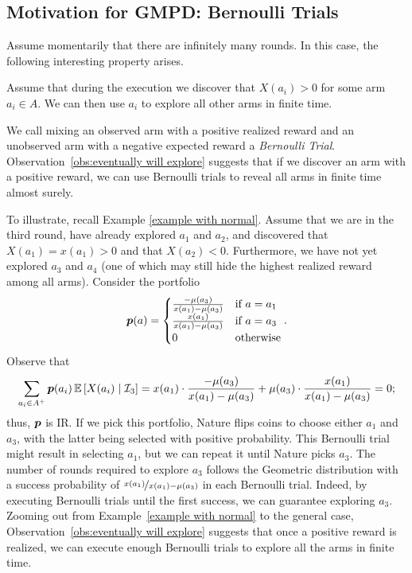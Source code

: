 \subsection{Motivation for GMPD: Bernoulli Trials}\label{subsec:bernoulli trials}
Assume momentarily that there are infinitely many rounds. In this case, the following interesting property arises.
\begin{observation}\label{obs:eventually will explore}
Assume that during the execution we discover that $X(a_i)>0$ for some arm $a_i\in A$. We can then use $a_i$ to explore all other arms in finite time.
\end{observation}
We call mixing an observed arm with a positive realized reward and an unobserved arm with a negative expected reward a \emph{Bernoulli Trial}. Observation~\ref{obs:eventually will explore} suggests that if we discover an arm with a positive reward, we can use Bernoulli trials to reveal all arms in finite time almost surely. 

To illustrate, recall Example \ref{example with normal}. Assume that we are in the third round, have already explored $a_1$ and $a_2$, and discovered that $X(a_1)=x(a_1)>0$ and that $X(a_2)<0$. Furthermore, we have not yet explored $a_3$ and $a_4$ (one of which may still hide the highest realized reward among all arms). Consider the portfolio 
\begin{align*}
\boldsymbol{ p }(a) =
\begin{cases}
\frac{-\mu(a_3)}{x(a_1)-\mu(a_3)} & \textnormal{if } a=a_1\\
\frac{x(a_1)}{x(a_1)-\mu(a_3)} & \textnormal{if } a=a_3\\
0 & \textnormal{otherwise}
\end{cases}.
\end{align*}
Observe that
\[
\sum_{a_i \in A^+} \boldsymbol{ p }(a_i)\operatorname{\mathbb{E}}\left[X(a_i)\mid \mathcal{I}_3\right]
=x(a_1)\cdot \frac{-\mu(a_3)}{x(a_1)-\mu(a_3)} + \mu(a_3)\cdot  \frac{x(a_1)}{x(a_1)-\mu(a_3)}   =0;
\]
thus, $\boldsymbol{ p }$ is IR. If we pick this portfolio, Nature flips coins to choose either $a_1$ and $a_3$, with the latter being selected with positive probability. This Bernoulli trial might result in selecting $a_1$, but we can repeat it until Nature picks $a_3$. The number of rounds required to explore $a_3$ follows the Geometric distribution with a success probability of $\nicefrac{x(a_1)}{x(a_1)-\mu(a_3)}$ in each Bernoulli trial. Indeed, by executing Bernoulli trials until the first success, we can guarantee exploring $a_3$. Zooming out from Example~\ref{example with normal} to the general case, Observation~\ref{obs:eventually will explore} suggests that once a positive reward is realized, we can execute enough Bernoulli trials to explore all the arms in finite time.

